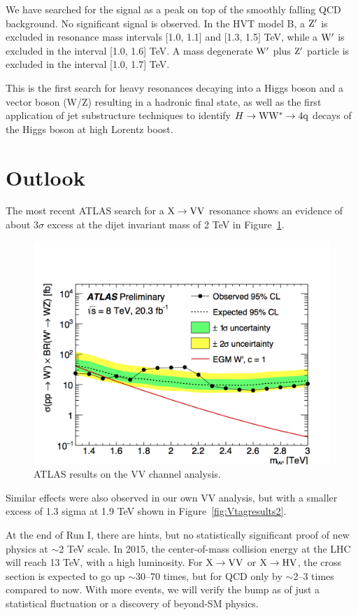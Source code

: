 We have searched for the signal as a peak on top of the smoothly
falling QCD background.  No significant signal is observed. 
In the HVT model B, 
a ${\rm Z'}$ is excluded in resonance mass intervals [1.0, 1.1] and 
[1.3, 1.5] TeV, while a ${\rm W'}$ is excluded in the interval [1.0, 1.6] TeV.  
A mass degenerate 
${\rm W'}$ plus ${\rm Z'}$ particle is excluded in the interval [1.0, 1.7] TeV.  

This is the first search for heavy resonances decaying into
a Higgs boson and a vector boson (W/Z) 
resulting in a hadronic final state,
as well as the first application of jet substructure techniques
to identify 
$H \to {\rm W}{\rm W}^*\to4{\rm q}$ decays of the Higgs boson at high Lorentz boost.

\section{Outlook}

The most recent ATLAS search for a ${\rm X \to VV}$ resonance shows an
 evidence of about 3$\sigma$ 
excess at the dijet invariant mass of 2 TeV in Figure~\ref{fig:atlasvv}. 
\begin{figure}[!htbp]
\centering
\includegraphics[width=.9\textwidth]{figures/atlas.png}
\caption{ATLAS results on the VV channel analysis.}
\label{fig:atlasvv}
\end{figure}
Similar effects were also observed in our own VV analysis, but with a smaller excess of 1.3 sigma at
1.9 TeV shown in Figure~\ref{fig:Vtagresults2}. 

At the end of Run I, there are 
hints, but no statistically significant proof of new physics at $\sim$2 TeV scale.
In 2015, the center-of-mass collision energy at the LHC will reach 13 TeV, with a high 
luminosity. For ${\rm X \to VV}$ or ${\rm X \to HV}$, the cross section is expected 
to go up $\sim$30--70 times, but for QCD only by $\sim$2--3 times compared to now. 
 With more events, we will verify the bump as of just a statistical fluctuation or a 
discovery of beyond-SM physics. 
 
